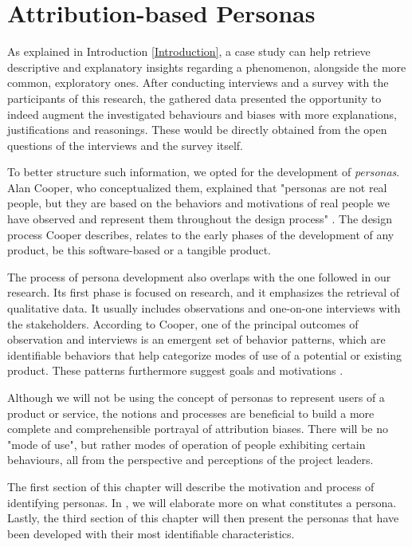 \chapter{Attribution-based Personas}
\label{Personas}

As explained in Introduction \ref{Introduction}, a case study can help retrieve descriptive and explanatory insights regarding a phenomenon, alongside the more common, exploratory ones. After conducting interviews and a survey with the participants of this research, the gathered data presented the opportunity to indeed augment the investigated behaviours and biases with more explanations, justifications and reasonings. These would be directly obtained from the open questions of the interviews and the survey itself.

To better structure such information, we opted for the development of \textit{personas}. Alan Cooper, who conceptualized them, explained that "personas are not real people, but they are based on the behaviors and motivations of real people we have observed and represent them throughout the design process" \cite{Cooper2007}. The design process Cooper describes, relates to the early phases of the development of any product, be this software-based or a tangible product.

The process of persona development also overlaps with the one followed in our research. Its first phase is focused on research, and it emphasizes the retrieval of qualitative data. It usually includes observations and one-on-one interviews with the stakeholders. According to Cooper, one of the principal outcomes of observation and interviews is an emergent set of behavior patterns, which are identifiable behaviors that help categorize modes of use of a potential or existing product. These patterns furthermore suggest goals and motivations \cite{Cooper2007}.

Although we will not be using the concept of personas to represent users of a product or service, the notions and processes are beneficial to build a more complete and comprehensible portrayal of attribution biases. There will be no "mode of use", but rather modes of operation of people exhibiting certain behaviours, all from the perspective and perceptions of the project leaders. 

The first section of this chapter will describe the motivation and process of identifying personas. In , we will elaborate more on what constitutes a persona. Lastly, the third section of this chapter will then present the personas that have been developed with their most identifiable characteristics.

